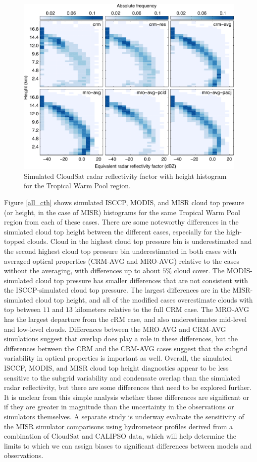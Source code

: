 \documentclass[letter]{article}
\begin{document}
\begin{figure}
\centering
\includegraphics{radar_alt40-dbze.pdf}
\caption{Simulated CloudSat radar reflectivity factor with height histogram for the Tropical Warm Pool region.}
\label{cfadDbze94_figure}
\end{figure}

Figure \ref{all_cth} shows simulated ISCCP, MODIS, and MISR cloud top presure (or height, in the case of MISR) histograms for the same Tropical Warm Pool region from each of these cases. There are some noteworthy differences in the simulated cloud top height between the different cases, especially for the high-topped clouds. Cloud in the highest cloud top pressure bin is underestimated and the second highest cloud top pressure bin underestimated in both cases with averaged optical properties (CRM-AVG and MRO-AVG) relative to the cases without the averaging, with differences up to about $5\%$ cloud cover. The MODIS-simulated cloud top pressure has smaller differences that are not consistent with the ISCCP-simulated cloud top pressure. The largest differences are in the MISR-simulated cloud top height, and all of the modified cases overestimate clouds with top between $11$ and $13$ kilometers relative to the full CRM case. The MRO-AVG has the largest departure from the cRM case, and also underestimates mid-level and low-level clouds. Differences between the MRO-AVG and CRM-AVG simulations suggest that overlap does play a role in these differences, but the differences between the CRM and the CRM-AVG cases suggest that the subgrid variability in optical properties is important as well. Overall, the simulated ISCCP, MODIS, and MISR cloud top height diagnostics appear to be less sensitive to the subgrid variability and condensate overlap than the simulated radar reflectivity, but there are some differences that need to be explored further. It is unclear from this simple analysis whether these differences are significant or if they are greater in magnitude than the uncertainty in the observations or simulators themselves. A separate study is underway evaluate the sensitivity of the MISR simulator comparisons using hydrometeor profiles derived from a combination of CloudSat and CALIPSO data, which will help determine the limits to which we can assign biases to significant differences between models and observations.
\end{document}

